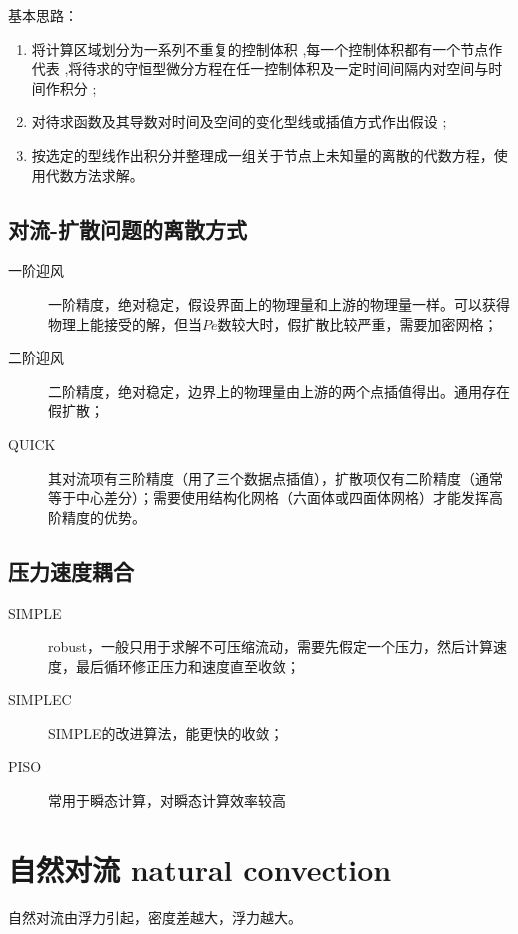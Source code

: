 基本思路：

\begin{enumerate}
    \item 将计算区域划分为一系列不重复的控制体积 ,每一个控制体积都有一个节点作代表 ,将待求的守恒型微分方程在任一控制体积及一定时间间隔内对空间与时间作积分 ;
    \item 对待求函数及其导数对时间及空间的变化型线或插值方式作出假设 ;
    \item 按选定的型线作出积分并整理成一组关于节点上未知量的离散的代数方程，使用代数方法求解。
\end{enumerate}

\subsection{对流-扩散问题的离散方式}

\begin{description}
    \item[一阶迎风] 一阶精度，绝对稳定，假设界面上的物理量和上游的物理量一样。可以获得物理上能接受的解，但当$ Pe $数较大时，假扩散比较严重，需要加密网格；
    \item[二阶迎风] 二阶精度，绝对稳定，边界上的物理量由上游的两个点插值得出。通用存在假扩散；
    \item[QUICK] 其对流项有三阶精度（用了三个数据点插值），扩散项仅有二阶精度（通常等于中心差分）；需要使用结构化网格（六面体或四面体网格）才能发挥高阶精度的优势。
\end{description}

\subsection{压力速度耦合}

\begin{description}
    \item[SIMPLE] robust，一般只用于求解不可压缩流动，需要先假定一个压力，然后计算速度，最后循环修正压力和速度直至收敛；
    \item[SIMPLEC] SIMPLE的改进算法，能更快的收敛；
    \item[PISO] 常用于瞬态计算，对瞬态计算效率较高
\end{description}

\section{自然对流 natural convection}

自然对流由浮力引起，密度差越大，浮力越大。


